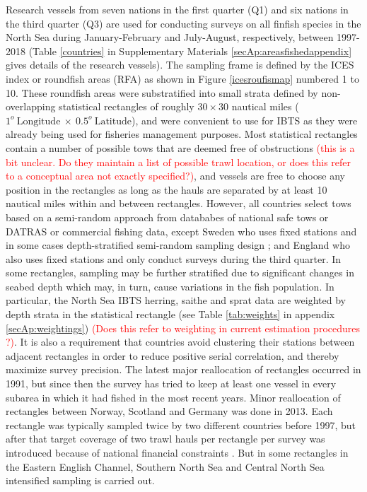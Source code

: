\documentclass[a4paper 12pt]{article}
\numberwithin{equation}{section}
\newcommand{\ed}[1]{\textcolor{red}{#1}}
\begin{document}
Research vessels from seven nations in the first quarter (Q1) and six nations in the third quarter (Q3) are used for conducting surveys on all finfish species in the North Sea during January-February and July-August, respectively, between 1997-2018 (Table \ref{countries} in Supplementary Materials \ref{secAp:areasfishedappendix} gives details of the research vessels). The sampling frame is defined by the ICES index or roundfish areas (RFA) as shown in Figure \ref{icesroufismap} numbered 1 to 10. These  roundfish areas were substratified into small strata defined by non-overlapping statistical rectangles of roughly $30 \times 30$ nautical miles ($1^{o} \  \mathrm{Longitude} \ \times  \  0.5^{o} \ \mathrm{Latitude}$), and were convenient to use for IBTS as they were already being used for fisheries management purposes. Most statistical rectangles contain a number of possible tows that are deemed free of obstructions \ed{(this is a bit unclear. Do they maintain a list of possible trawl location, or does this refer to a conceptual area not exactly specified?)}, and vessels are free to choose any position in the rectangles as long as the hauls are separated by at least 10 nautical miles within and between rectangles. However, all countries select tows based on a semi-random approach from datababes of national safe tows or DATRAS or commercial fishing data, except Sweden who uses fixed stations and in some cases depth-stratified semi-random sampling design \citep{ICES2018}; and England who also uses fixed stations and only conduct surveys during the third quarter. In some rectangles, sampling may be further stratified due to significant changes in seabed depth which may, in turn, cause variations in the fish population. In particular, the North Sea IBTS herring, saithe and sprat data are weighted by depth strata in the statistical rectangle (see Table \ref{tab:weights} in appendix \ref{secAp:weightings}) \ed{(Does this refer to weighting in current estimation procedures ?)}. It is also a requirement that countries avoid clustering their stations between adjacent rectangles in order to reduce positive serial correlation, and thereby maximize survey precision.  The latest major reallocation of rectangles occurred in 1991, but since then the survey has tried to keep at least one vessel in every subarea in which it had fished in the most recent years. Minor reallocation of rectangles between Norway, Scotland and Germany was done in 2013. Each rectangle was  typically sampled twice by two different countries before 1997, but after that target coverage of two trawl hauls per rectangle per survey  was introduced because of national financial constraints \citep{ICES2015}. But in some rectangles in the Eastern English Channel, Southern North Sea and Central North Sea intensified sampling is carried out.\\
\end{document}

